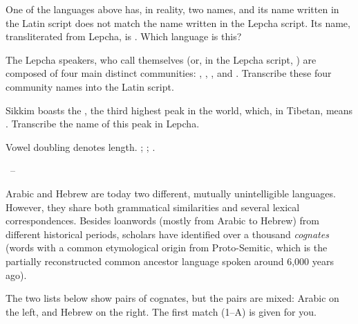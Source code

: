 \begin{refsection}
\begin{problem}{\langnameLepcha}{\nameMChoudhury}{}
\begin{assgts}
\item One of the languages above has, in reality, two names, and its name written in the Latin script does not match the name written in the Lepcha script. Its name, transliterated from Lepcha, is . Which language is this?
\item The Lepcha speakers, who call themselves  (or, in the Lepcha script, ) are composed of four main distinct communities: , , , and . Transcribe these four community names into the Latin script.
\item Sikkim boasts the , the third highest peak in the world, which, in Tibetan, means . Transcribe the name of this peak in Lepcha.
\end{assgts}

\begin{tblsWarning}
Vowel doubling denotes length. ; ; .
\end{tblsWarning}
\end{problem}

\begin{problem}{\langnameArabic\ -- \langnameHebrew}{\nameGParti}{}

Arabic and Hebrew are today two different, mutually unintelligible languages. However, they share both grammatical similarities and several lexical correspondences. Besides loanwords (mostly from Arabic to Hebrew) from different historical periods, scholars have identified over a thousand \textit{cognates} (words with a common etymological origin from Proto-Semitic, which is the partially re\-con\-structed common ancestor language spoken around 6,000 years ago).

The two lists below show pairs of cognates, but the pairs are mixed: Arabic on the left, and Hebrew on the right. The first match (1--A) is given for you.


\end{problem}
\end{refsection}
